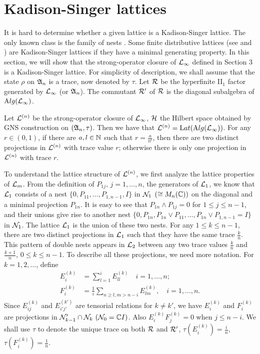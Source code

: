 \section{Kadison-Singer lattices}

\vskip10pt

\noindent It is hard to determine whether a given lattice is a
Kadison-Singer lattice. The only known class is the family of nests
\cite{KS}. Some finite distributive lattices (see \cite{H2} and \cite{Ha}) are
Kadison-Singer lattices if they have a minimal generating property.
In this section, we will show that the strong-operator closure of
$\mathcal L_\infty$ defined in Section 3 is a Kadison-Singer lattice. For
simplicity of description, we shall assume that the state $\rho$ on
$\mathfrak A_n$ is a trace, now denoted by $\tau$. Let $\mathcal R$ be the
hyperfinite II$_1$ factor generated by $\mathcal L_\infty$ (or $\mathfrak A_n$). The
commutant $\mathcal R'$ of $\mathcal R$ is the diagonal subalgebra of
$\mathrm Alg(\mathcal L_\infty)$.

\begin{theorem}
Let
$\mathcal L^{(n)}$ be the strong-operator closure of $\mathcal L_\infty$, $\mathcal H$ the
Hilbert space obtained by GNS construction on $(\mathfrak A_n, \tau)$. Then
we have that $\mathcal L^{(n)}=\mathrm Lat(\mathrm Alg(\mathcal L_\infty))$. For any
$r\in(0,1)$, if there are $a,l\in\mathbb N$ such that $r=\frac{a}{n^l}$,
then there are two distinct projections in $\mathcal L^{(n)}$ with trace
value $r$; otherwise there is only one projection in $\mathcal L^{(n)}$
with trace $r$. 
\end{theorem}

To understand the lattice structure of $\mathcal L^{(n)}$, we first
analyze the lattice properties of $\mathcal L_m$. From the definition of
$P_{1j}$, $j=1,\ldots,n$, the generators of $\mathcal L_1$, we know that
$\mathcal L_1$ consists of a nest $\{0, P_{11},\ldots, P_{1,n-1}, I\}$ in
$\mathcal N_1$ $(\cong M_n(\mathbb C))$ on the diagonal and a minimal
projection $P_{1n}$. It is easy to see that $P_{1n}\wedge
P_{1j}=0$ for $1\leq j\le n-1$, and their unions give rise to
another nest $\{0, P_{1n}, P_{1n}\vee P_{11}, \ldots, P_{1n}\vee
P_{1,n-1}=I\}$ in $\mathcal N_1$. The lattice $\mathcal L_1$ is the union of
these two nests. For any $1\leq k\leq n-1$, there are two distinct
projections in $\mathcal L_1$ such that they have the same trace $\frac{
k}{n}$. This pattern of double nests appears in $\mathcal L_2$ between any
two trace values $\frac{k}{n}$ and $\frac{k+1}{n}$, $0\leq k\leq n-1$. To
describe all these projections, we need more notation. For
$k=1,2,\ldots$, define
\begin{align*}
E_{i}^{(k)} &= \sum_{l=1}^{i} E_{ll}^{(k)}  \quad i=1,\ldots,
  n;\quad \\
F_{i}^{(k)} &= \frac{1}{i}\sum_{n\ge l,m > n-i} E_{lm}^{(k)}, \quad
i =1,\ldots,n.
\end{align*}
Since $E_{ij}^{(k)}$ and $E_{i'j'}^{(k')}$ are tensorial relations
for $k\neq k'$, we have $E_{i}^{(k)}$ and $F_{i}^{(k)}$ are
projections in $\mathcal N_{k-1}' \cap \mathcal N_k\ ( \mathcal N_{0} = \mathbb C I )$.
Also $E_{i}^{(k)}F_{j}^{(k)} = 0$ when $j \leq n-i$. We shall use
$\tau$ to denote the unique trace on both $\mathcal R$ and $\mathcal R'$,
$\tau(E_{i}^{(k)}) = \frac{i}{n}$, $\tau(F_{i}^{(k)}) =
\frac{1}{n}$.

